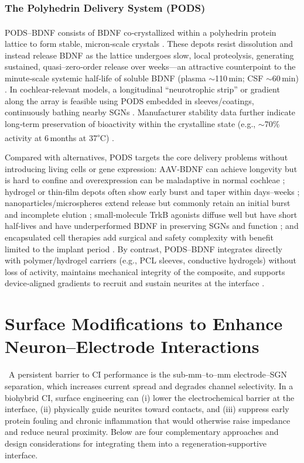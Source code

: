 \documentclass[referee,pdflatex, sn-vancouver-num]{sn-jnl}%
\theoremstyle{thmstyleone}%
\theoremstyle{thmstyletwo}%
\theoremstyle{thmstylethree}%
\begin{document}
\subsubsection{The Polyhedrin Delivery System (PODS\texorpdfstring{\textsuperscript{\textregistered}}{(R)})}
PODS\textsuperscript{\textregistered}–BDNF consists of BDNF co‑crystallized within a polyhedrin protein lattice to form stable, micron‑scale crystals \cite{Ikeda2006,Coulibaly2007,Coulibaly2009,Mori2007,Tanaka2007,Ijiri2009}. These depots resist dissolution and instead release BDNF as the lattice undergoes slow, local proteolysis, generating sustained, quasi–zero‑order release over weeks—an attractive counterpoint to the minute‑scale systemic half‑life of soluble BDNF (plasma $\sim$110\,min; CSF $\sim$60\,min) \cite{Mori2007,Poduslo1996,Sakane1997,Soderquist2009}. In cochlear‑relevant models, a longitudinal ``neurotrophic strip'' or gradient along the array is feasible using PODS embedded in sleeves/coatings, continuously bathing nearby SGNs \cite{Nella2022NeurotrophinGradients,Chang2020StemCellNiche}. Manufacturer stability data further indicate long‑term preservation of bioactivity within the crystalline state (e.g., $\sim$70\% activity at 6\,months at 37\textsuperscript{$\circ$}C) \cite{CellGS_PODS}.

Compared with alternatives, PODS targets the core delivery problems without introducing living cells or gene expression: AAV‑BDNF can achieve longevity but is hard to confine and overexpression can be maladaptive in normal cochleae \cite{Lee2016}; hydrogel or thin‑film depots often show early burst and taper within days–weeks \cite{Zimmermann2000}; nanoparticles/microspheres extend release but commonly retain an initial burst and incomplete elution \cite{Schmidt2018}; small‑molecule TrkB agonists diffuse well but have short half‑lives and have underperformed BDNF in preserving SGNs and function \cite{vink2022,heuer2021}; and encapsulated cell therapies add surgical and safety complexity with benefit limited to the implant period \cite{Pettingill2011}. By contrast, PODS–BDNF integrates directly with polymer/hydrogel carriers (e.g., PCL sleeves, conductive hydrogels) without loss of activity, maintains mechanical integrity of the composite, and supports device‑aligned gradients to recruit and sustain neurites at the interface \cite{Nella2022NeurotrophinGradients,Chang2020}.

\section{Surface Modifications to Enhance Neuron--Electrode Interactions}\label{sec6}
\
A persistent barrier to CI performance is the sub‑mm–to–mm electrode–SGN separation, which increases current spread and degrades channel selectivity. In a biohybrid CI, surface engineering can (i) lower the electrochemical barrier at the interface, (ii) physically guide neurites toward contacts, and (iii) suppress early protein fouling and chronic inflammation that would otherwise raise impedance and reduce neural proximity. Below are four complementary approaches and design considerations for integrating them into a regeneration‑supportive interface.
\end{document}
